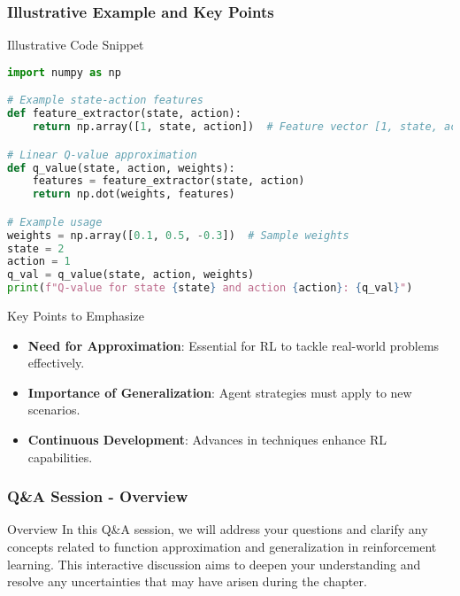 \documentclass[aspectratio=169]{beamer}
\begin{document}
\begin{frame}[fragile]
    \frametitle{Illustrative Example and Key Points}
    \begin{block}{Illustrative Code Snippet}
        \begin{lstlisting}[language=Python]
import numpy as np

# Example state-action features
def feature_extractor(state, action):
    return np.array([1, state, action])  # Feature vector [1, state, action]

# Linear Q-value approximation
def q_value(state, action, weights):
    features = feature_extractor(state, action)
    return np.dot(weights, features)

# Example usage
weights = np.array([0.1, 0.5, -0.3])  # Sample weights
state = 2
action = 1
q_val = q_value(state, action, weights)
print(f"Q-value for state {state} and action {action}: {q_val}")
        \end{lstlisting}
    \end{block}

    \begin{block}{Key Points to Emphasize}
        \begin{itemize}
            \item \textbf{Need for Approximation}: Essential for RL to tackle real-world problems effectively.
            \item \textbf{Importance of Generalization}: Agent strategies must apply to new scenarios.
            \item \textbf{Continuous Development}: Advances in techniques enhance RL capabilities.
        \end{itemize}
    \end{block}
\end{frame}

\begin{frame}[fragile]
  \frametitle{Q\&A Session - Overview}
  \begin{block}{Overview}
    In this Q\&A session, we will address your questions and clarify any concepts related to function approximation and generalization in reinforcement learning.
    This interactive discussion aims to deepen your understanding and resolve any uncertainties that may have arisen during the chapter.
  \end{block}
\end{frame}
\end{document}
